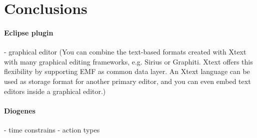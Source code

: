 \section{Conclusions}\label{sec:conclusions}


\paragraph{Eclipse plugin}
- graphical editor (You can combine the text-based formats created with Xtext with many graphical editing frameworks, e.g. Sirius or Graphiti. Xtext offers this flexibility by supporting EMF as common data layer. An Xtext language can be used as storage format for another primary editor, and you can even embed text editors inside a graphical editor.)

\paragraph{Diogenes}
- time constrains
- action types



\endinput


The goal of this Master's thesis was to reduce the gap between two distinct worlds. The first one, more theoretical, defines session-types, \coco specifications and all the theories that support the \textit{contract-oriented} paradigm. On the other side, it exists the more practical world where service-oriented computing allows to construct distributed applications by discovering, integrating and using
basic services. 

Services are implemented using high-level languages (like Java, CS, etc.) and frameworks; furthermore, they may be provided by different organisations, possibly in competition (when not in conflict) among each other. Services can also appear and disappear from the network, and they can dynamically discover and invoke other services in order to exploit their functionality. 
The first step into this scenario was made with the development of a \textit{contract-oriented middleware}, allowing developers to write distributed applications that interact advertising \textit{contracts} and through \textit{monitored sessions}. However, there was not way to verify if these applications were \emph{honest} or not.

The first part of our work was the study, the design and the development of an Eclipse plugin that allows to write \textit{\coco processes} that automatically were translated to two target languages, Maude and Java, both \textit{honesty}-verifiable. This aims to support an application developer, who wants to be honest, to avoid errors that will make him culpable at runtime.
It required a better mapping between \coco and the middleware APIs, driving us to an extended version of these last.

